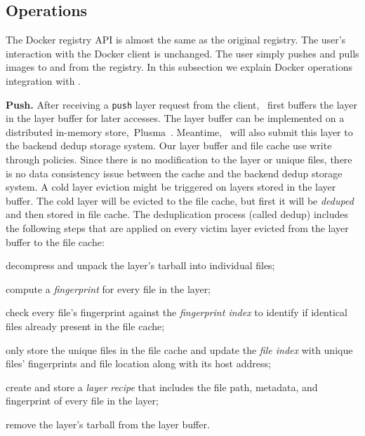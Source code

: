 \subsection{Operations}
\label{sec:design_operations}

%
The Docker registry API is almost the same as the original registry.
The user's interaction with the Docker client is unchanged. 
The user simply pushes and pulls images to and from the registry. 
In this subsection we explain Docker operations integration with \sysname.


\textbf{Push.}
After receiving a \texttt{push} layer request from the client, 
\sysname~first buffers the layer in the layer buffer for later accesses. 
The layer buffer can be implemented on a distributed in-memory store,~\eg Plusma~\cite{xxx}.
Meantime, \sysname~will also submit this layer to the backend dedup storage system.
Our layer buffer and file cache use write through policies. 
Since there is no modification to the layer or unique files, 
there is no data consistency issue between the cache and the backend dedup storage system.
A cold layer eviction might be triggered on layers stored in the layer buffer.
The cold layer will be evicted to the file cache, but first it will be \emph{deduped} and then stored in file cache.
The deduplication process (called dedup) includes the following steps 
that are applied on every victim layer evicted from the layer buffer to the file cache:

\begin{compactenumerate}
	\item decompress and unpack the layer's tarball into individual files;
	\item compute a \emph{fingerprint} for every file in the layer;
	\item check every file's fingerprint against the \emph{fingerprint index} to
	identify if identical files already present in the file cache;
	\item only store the unique files in the file cache and update the 
	\emph{file index} with unique files' fingerprints and file location along with its host address;
	\item create and store a \emph{layer recipe} that includes the file path,
	metadata, and fingerprint of every file in the layer;
	\item remove the layer's tarball from the layer buffer.
\end{compactenumerate}

